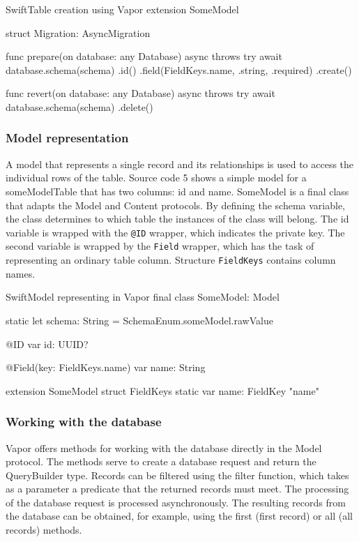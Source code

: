 \documentclass[
  biblatex,
  language=english,
  figures=false,
  sourcecodes,
  glossaries,
  index
]{kidiplom}
\begin{document}
\begin{kicode}{Swift}{}{Table creation using Vapor}
extension SomeModel {
    struct Migration: AsyncMigration {
        
        func prepare(on database: any Database) async throws {
            try await database.schema(schema)
                .id()
                .field(FieldKeys.name, .string, .required)
                .create()
        }
        
        func revert(on database: any Database) async throws {
            try await database.schema(schema)
                .delete()
        }
    }
}
\end{kicode}

\subsubsection{Model representation}
A model that represents a single record and its relationships is used to access the individual rows of the table. Source code 5 shows a simple model for a someModelTable that has two columns: id and name. SomeModel is a final class that adapts the Model and Content protocols. By defining the schema variable, the class determines to which table the instances of the class will belong. The id variable is wrapped with the \texttt{@ID} wrapper, which indicates the private key. The second variable is wrapped by the \texttt{Field} wrapper, which has the task of representing an ordinary table column. Structure \texttt{FieldKeys} contains column names.

\begin{kicode}{Swift}{}{Model representing in Vapor}
final class SomeModel: Model {
    
    static let schema: String = SchemaEnum.someModel.rawValue
    
    @ID
    var id: UUID?
    
    @Field(key: FieldKeys.name)
    var name: String
}
extension SomeModel {
    struct FieldKeys {
        static var name: FieldKey {"name"}
    }
}
\end{kicode}

\subsubsection{Working with the database}
Vapor offers methods for working with the database directly in the Model protocol. The methods serve to create a database request and return the QueryBuilder type. Records can be filtered using the filter function, which takes as a parameter a predicate that the returned records must meet. The processing of the database request is processed asynchronously. The resulting records from the database can be obtained, for example, using the first (first record) or all (all records) methods.
\end{document}
